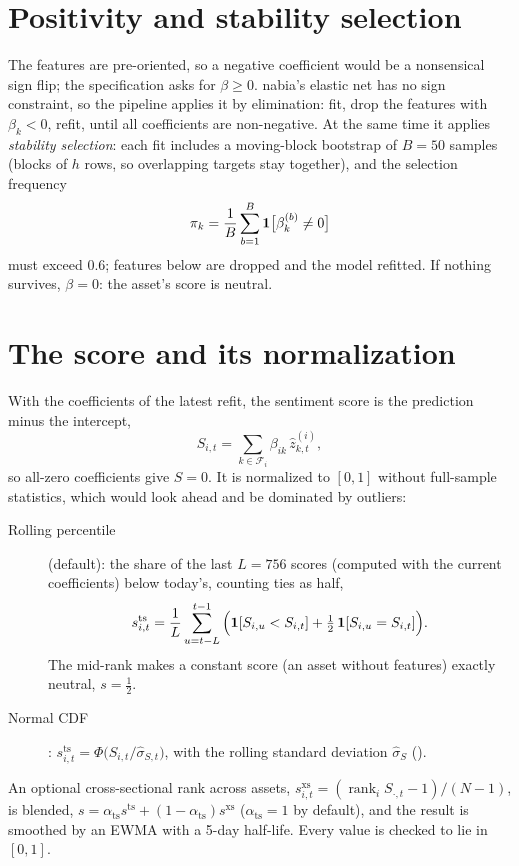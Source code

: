 \section{Positivity and stability selection}
The features are pre-oriented, so a negative coefficient would be a nonsensical sign flip; the specification asks
for $\beta\ge0$. nabia's elastic net has no sign constraint, so the pipeline applies it by elimination: fit, drop
the features with $\beta_k<0$, refit, until all coefficients are non-negative. At the same time it applies
\emph{stability selection}: each fit includes a moving-block bootstrap of $B=50$ samples (blocks of $h$ rows, so
overlapping targets stay together), and the selection frequency
\[
  \pi_k=\frac1B\sum_{b=1}^B\mathbf 1\big[\beta^{(b)}_k\ne0\big]
\]
must exceed $0.6$; features below are dropped and the model refitted. If nothing survives, $\beta=0$: the asset's
score is neutral.

\section{The score and its normalization}
With the coefficients of the latest refit, the sentiment score is the prediction minus the intercept,
\[
  S_{i,t}=\sum_{k\in\mathcal F_i}\beta_{ik}\,\hat z^{(i)}_{k,t},
\]
so all-zero coefficients give $S=0$. It is normalized to $[0,1]$ without full-sample statistics, which would look
ahead and be dominated by outliers:
\begin{description}
  \item[Rolling percentile] (default): the share of the last $L=756$ scores (computed with the current
        coefficients) below today's, counting ties as half,
        \[
          s^{\mathrm{ts}}_{i,t}=\frac1L\sum_{u=t-L}^{t-1}\Big(\mathbf 1[S_{i,u}<S_{i,t}]+\tfrac12\,\mathbf 1[S_{i,u}=S_{i,t}]\Big).
        \]
        The mid-rank makes a constant score (an asset without features) exactly neutral, $s=\tfrac12$.
  \item[Normal CDF]: $s^{\mathrm{ts}}_{i,t}=\Phi\big(S_{i,t}/\hat\sigma_{S,t}\big)$, with the rolling standard
        deviation $\hat\sigma_S$ ().
\end{description}
An optional cross-sectional rank across assets,
$s^{\mathrm{xs}}_{i,t}=(\operatorname{rank}_i S_{\cdot,t}-1)/(N-1)$, is blended,
$s=\alpha_{\mathrm{ts}}s^{\mathrm{ts}}+(1-\alpha_{\mathrm{ts}})s^{\mathrm{xs}}$ ($\alpha_{\mathrm{ts}}=1$ by default),
and the result is smoothed by an EWMA with a 5-day half-life. Every value is checked to lie in $[0,1]$.

